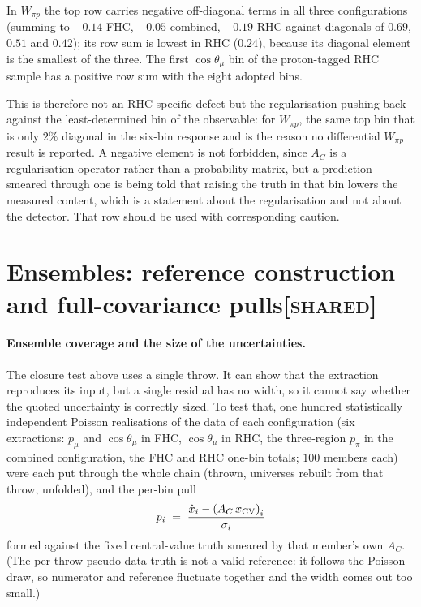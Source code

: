 \documentclass[11pt,a4paper]{article}
\newcommand{\scopetag}[1]{\hfill{\normalfont\small\textsc{[#1]}}}
\begin{document}
In $W_{\pi p}$ the top row carries negative off-diagonal terms in all three
configurations (summing to $-0.14$ FHC, $-0.05$ combined, $-0.19$ RHC against diagonals of
$0.69$, $0.51$ and $0.42$); its row sum is lowest in RHC ($0.24$), because its
diagonal element is the smallest of the three. The first $\cos\theta_\mu$ bin of the
proton-tagged RHC sample has a positive row sum with the eight adopted bins.

This is therefore not an RHC-specific defect but the regularisation pushing back against the
least-determined bin of the observable: for $W_{\pi p}$, the same top bin that is only
$2\%$ diagonal in the six-bin response and is the reason no differential $W_{\pi p}$ result is
reported.  A negative element is not forbidden, since $A_C$ is a regularisation
operator rather than a probability matrix, but a prediction smeared through one is being
told that raising the truth in that bin lowers the measured content, which is a
statement about the regularisation and not about the detector. That row should be used with
corresponding caution.


\section[Ensembles: reference construction and full-covariance pulls]{Ensembles: reference construction and full-covariance pulls\scopetag{shared}}
\label{sec:supp_ensemble}

\paragraph{Ensemble coverage and the size of the uncertainties.}
\label{par:ensemble}
The closure test above uses a single throw.  It can show that the extraction reproduces
its input, but a single residual has no width, so it cannot say whether the quoted
uncertainty is correctly sized.  To test that, one hundred statistically independent
Poisson realisations of the data of each configuration (six extractions: $p_\mu$ and
$\cos\theta_\mu$ in FHC, $\cos\theta_\mu$ in RHC, the three-region $p_\pi$ in the combined
configuration, the FHC and RHC one-bin totals; $100$ members each) were each put through the
whole chain (thrown, universes rebuilt from that throw, unfolded), and the per-bin pull
\[
  p_i \;=\; \frac{\hat{x}_i - \left(A_C\,x_{\rm CV}\right)_i}{\sigma_i}
\]
formed against the fixed central-value truth smeared by that member's own $A_C$.  (The
per-throw pseudo-data truth is not a valid reference: it follows the Poisson draw, so
numerator and reference fluctuate together and the width comes out too small.)
\end{document}
